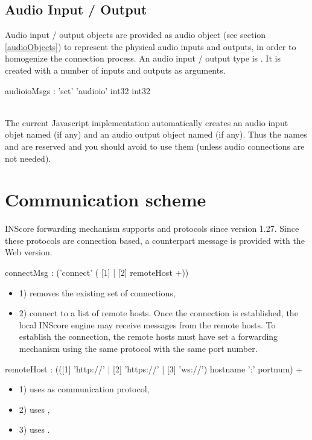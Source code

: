 \documentclass[a4paper,twoside]{article}
\newcommand{\toplevel}[1]	{\section{#1}}
\newcommand{\sublevel}[1]	{\subsection{#1}}
\begin{document}
\sublevel{Audio Input / Output}
\label{audioioObjects}

Audio input / output objects are provided as audio object (see section \ref{audioObjects}) to represent the physical audio inputs and outputs, in order to homogenize the connection process.
An audio input / output type is . It is created with a number of inputs and outputs as arguments.

\begin{rail}
audioioMsgs : 'set' 'audioio' int32 int32
\end{rail}

\note\\
The current Javascript implementation automatically creates an audio input objet named  (if any) and an audio output object named   (if any). Thus the names  and  are reserved and you should avoid to use them (unless audio connections are not needed).
 

\toplevel{Communication scheme}
\label{communication}

INScore forwarding mechanism supports  and  protocols since version 1.27. Since these protocols are connection based, a counterpart  message is provided with the Web version.

\begin{rail}
connectMsg : ('connect' ( [1] | [2] remoteHost +))
\end{rail}

\begin{itemize}
\item 1) removes the existing set of connections,
\item 2) connect to a list of remote hosts. Once the connection is established, the local INScore engine may receive messages from the remote hosts. To establish the connection, the remote hosts must have set a forwarding mechanism using the same protocol with the same port number. 
\end{itemize}

\begin{rail}
remoteHost : (([1] 'http://' |  [2] 'https://' |  [3] 'ws://') hostname ':' portnum) +
\end{rail}

\begin{itemize}
\item 1) uses  as communication protocol,
\item 2) uses ,
\item 3) uses . 
\end{itemize}
\end{document}
